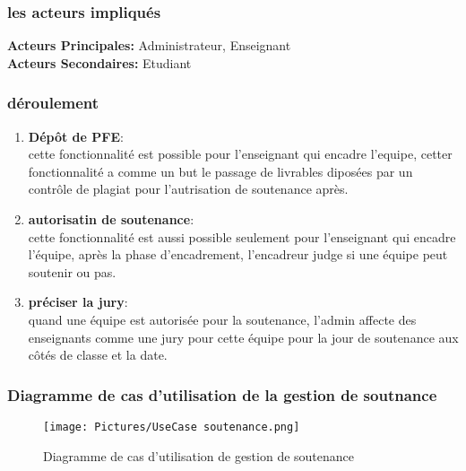 \documentclass[11pt,fleqn]{book} %
\begin{document}
\subsubsection{les acteurs impliqués}
\textbf{Acteurs Principales:} Administrateur, Enseignant\\
\textbf{Acteurs Secondaires:} Etudiant
\subsubsection{déroulement}

\begin{enumerate}
    \item \textbf{Dépôt  de PFE}:\\ cette fonctionnalité est possible pour l'enseignant qui encadre l'equipe, cetter fonctionnalité a comme un but le passage de livrables diposées par un contrôle de plagiat pour l'autrisation de soutenance après.
    \item \textbf{autorisatin de soutenance}:\\ 
     cette fonctionnalité est aussi possible seulement pour l'enseignant qui encadre l'équipe, après la phase d'encadrement, l'encadreur judge si une équipe peut soutenir ou pas.
    \item \textbf{préciser la jury}:\\ quand une équipe est autorisée pour la soutenance, l'admin affecte des enseignants comme une jury pour cette équipe pour la jour de soutenance aux côtés de classe et la date.
\end{enumerate}
\newpage
\subsubsection{Diagramme de cas d’utilisation de la gestion 
de soutnance}

\begin{figure}[h]
    \centering
    \texttt{[image: Pictures/UseCase soutenance.png]}
    \caption{Diagramme de cas d'utilisation de gestion de soutenance}
    \label{fig:pca}
\end{figure}
\newpage
\end{document}
